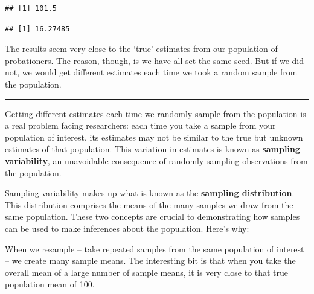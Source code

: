 \documentclass[
]{book}
\newenvironment{Shaded}{\begin{snugshade}}{\end{snugshade}}
\newcommand{\CommentTok}[1]{\textcolor[rgb]{0.56,0.35,0.01}{\textit{#1}}}
\newcommand{\FunctionTok}[1]{\textcolor[rgb]{0.00,0.00,0.00}{#1}}
\newcommand{\NormalTok}[1]{#1}
\newcommand{\SpecialCharTok}[1]{\textcolor[rgb]{0.00,0.00,0.00}{#1}}
\begin{document}
\begin{Shaded}
\end{Shaded}

\begin{verbatim}
## [1] 101.5
\end{verbatim}

\begin{Shaded}
\end{Shaded}

\begin{verbatim}
## [1] 16.27485
\end{verbatim}

The results seem very close to the `true' estimates from our population of probationers. The reason, though, is we have all set the same seed. But if we did not, we would get different estimates each time we took a random sample from the population.

\begin{center}\rule{0.5\linewidth}{0.5pt}\end{center}

Getting different estimates each time we randomly sample from the population is a real problem facing researchers: each time you take a sample from your population of interest, its estimates may not be similar to the true but unknown estimates of that population. This variation in estimates is known as \textbf{sampling variability}, an unavoidable consequence of randomly sampling observations from the population.

Sampling variability makes up what is known as the \textbf{sampling distribution}. This distribution comprises the means of the many samples we draw from the same population. These two concepts are crucial to demonstrating how samples can be used to make inferences about the population. Here's why:

When we resample -- take repeated samples from the same population of interest -- we create many sample means. The interesting bit is that when you take the overall mean of a large number of sample means, it is very close to that true population mean of 100.
\end{document}
